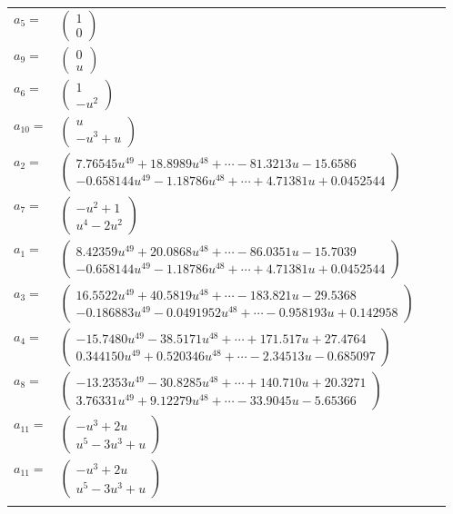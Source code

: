 \documentclass[1p]{elsarticle_modified}
\theoremstyle{definition}
\begin{document}
\begin{tabular}{m{7pt} m{180pt} m{7pt} m{180pt} }
\flushright $a_{5}=$&$\begin{pmatrix}1\\0\end{pmatrix}$ \\
\flushright $a_{9}=$&$\begin{pmatrix}0\\u\end{pmatrix}$ \\
\flushright $a_{6}=$&$\begin{pmatrix}1\\- u^2\end{pmatrix}$ \\
\flushright $a_{10}=$&$\begin{pmatrix}u\\- u^3+u\end{pmatrix}$ \\
\flushright $a_{2}=$&$\begin{pmatrix}7.76545 u^{49}+18.8989 u^{48}+\cdots-81.3213 u-15.6586\\-0.658144 u^{49}-1.18786 u^{48}+\cdots+4.71381 u+0.0452544\end{pmatrix}$ \\
\flushright $a_{7}=$&$\begin{pmatrix}- u^2+1\\u^4-2 u^2\end{pmatrix}$ \\
\flushright $a_{1}=$&$\begin{pmatrix}8.42359 u^{49}+20.0868 u^{48}+\cdots-86.0351 u-15.7039\\-0.658144 u^{49}-1.18786 u^{48}+\cdots+4.71381 u+0.0452544\end{pmatrix}$ \\
\flushright $a_{3}=$&$\begin{pmatrix}16.5522 u^{49}+40.5819 u^{48}+\cdots-183.821 u-29.5368\\-0.186883 u^{49}-0.0491952 u^{48}+\cdots-0.958193 u+0.142958\end{pmatrix}$ \\
\flushright $a_{4}=$&$\begin{pmatrix}-15.7480 u^{49}-38.5171 u^{48}+\cdots+171.517 u+27.4764\\0.344150 u^{49}+0.520346 u^{48}+\cdots-2.34513 u-0.685097\end{pmatrix}$ \\
\flushright $a_{8}=$&$\begin{pmatrix}-13.2353 u^{49}-30.8285 u^{48}+\cdots+140.710 u+20.3271\\3.76331 u^{49}+9.12279 u^{48}+\cdots-33.9045 u-5.65366\end{pmatrix}$ \\
\flushright $a_{11}=$&$\begin{pmatrix}- u^3+2 u\\u^5-3 u^3+u\end{pmatrix}$\\ \flushright $a_{11}=$&$\begin{pmatrix}- u^3+2 u\\u^5-3 u^3+u\end{pmatrix}$\\&\end{tabular}
\end{document}
